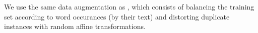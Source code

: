 \documentclass[ms,electronic,twosidetoc,letterpaper,chaptercenter,parttop,lof,lot]{byumsphd}
\begin{document}
We use the same data augmentation as \cite{sudholt2017}, which consists of balancing the training set according to word occurances (by their text) and distorting duplicate instances with random affine transformations.



\end{document}
